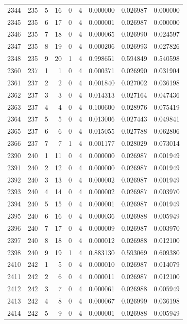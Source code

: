 \begin{longtable}{rrrrrrrrr}
2344 & 235 & 5 & 16 & 0 & 4 & 0.000000 & 0.026987 & 0.000000 \\
2345 & 235 & 6 & 17 & 0 & 4 & 0.000001 & 0.026987 & 0.000000 \\
2346 & 235 & 7 & 18 & 0 & 4 & 0.000065 & 0.026990 & 0.024597 \\
2347 & 235 & 8 & 19 & 0 & 4 & 0.000206 & 0.026993 & 0.027826 \\
2348 & 235 & 9 & 20 & 1 & 4 & 0.998651 & 0.594849 & 0.540598 \\
2360 & 237 & 1 & 1 & 0 & 4 & 0.000371 & 0.026990 & 0.031904 \\
2361 & 237 & 2 & 2 & 0 & 4 & 0.001840 & 0.027002 & 0.036198 \\
2362 & 237 & 3 & 3 & 0 & 4 & 0.014313 & 0.027164 & 0.047436 \\
2363 & 237 & 4 & 4 & 0 & 4 & 0.100600 & 0.028976 & 0.075419 \\
2364 & 237 & 5 & 5 & 0 & 4 & 0.013006 & 0.027443 & 0.049841 \\
2365 & 237 & 6 & 6 & 0 & 4 & 0.015055 & 0.027788 & 0.062806 \\
2366 & 237 & 7 & 7 & 1 & 4 & 0.001177 & 0.028029 & 0.073014 \\
2390 & 240 & 1 & 11 & 0 & 4 & 0.000000 & 0.026987 & 0.001949 \\
2391 & 240 & 2 & 12 & 0 & 4 & 0.000000 & 0.026987 & 0.001949 \\
2392 & 240 & 3 & 13 & 0 & 4 & 0.000002 & 0.026987 & 0.001949 \\
2393 & 240 & 4 & 14 & 0 & 4 & 0.000002 & 0.026987 & 0.003970 \\
2394 & 240 & 5 & 15 & 0 & 4 & 0.000001 & 0.026987 & 0.001949 \\
2395 & 240 & 6 & 16 & 0 & 4 & 0.000036 & 0.026988 & 0.005949 \\
2396 & 240 & 7 & 17 & 0 & 4 & 0.000009 & 0.026987 & 0.003970 \\
2397 & 240 & 8 & 18 & 0 & 4 & 0.000012 & 0.026988 & 0.012100 \\
2398 & 240 & 9 & 19 & 1 & 4 & 0.883130 & 0.593069 & 0.609380 \\
2410 & 242 & 1 & 5 & 0 & 4 & 0.000010 & 0.026987 & 0.014079 \\
2411 & 242 & 2 & 6 & 0 & 4 & 0.000011 & 0.026987 & 0.012100 \\
2412 & 242 & 3 & 7 & 0 & 4 & 0.000061 & 0.026988 & 0.005949 \\
2413 & 242 & 4 & 8 & 0 & 4 & 0.000067 & 0.026999 & 0.036198 \\
2414 & 242 & 5 & 9 & 0 & 4 & 0.000001 & 0.026988 & 0.005949 \\

\end{longtable}
